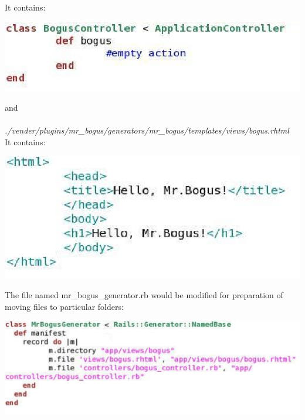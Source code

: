 \documentclass[10pt,oneside]{article}
\begin{document}
\\
It contains:\\
\begin{center}
 \includegraphics[width=150mm]{fig/instruction-3.eps}\\
\end{center}
and\\ 
\\
\textit{./vender/plugins/mr\_bogus/generators/mr\_bogus/templates/views/bogus.rhtml}\\
It contains:\\
\begin{center}
 \includegraphics[width=150mm]{fig/instruction-4.eps}\\
\end{center}
The file named mr\_bogus\_generator.rb would be modified for preparation of moving files to particular folders:\\
\begin{center}
 \includegraphics[width=150mm]{fig/instruction-5.eps}\\
\end{center}
\end{document}
